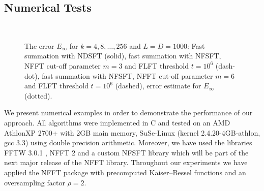 \subsection{Numerical Tests}

\begin{figure}[tb]
  \centering
  \hfill
  \\
  \caption{The error $E_{\infty}$ for $k = 4,8,\ldots,256$ and $L = D = 1000$: 
  Fast summation with NDSFT (solid), fast summation with NFSFT, 
  NFFT cut-off parameter $m = 3$ and FLFT threshold $t = 10^6$ (dash-dot), 
  fast summation with NFSFT, NFFT cut-off 
  parameter $m = 6$ and FLFT threshold $t = 10^6$ (dashed), error estimate for 
  $E_{\infty}$ (dotted).}
  \label{fig:error}
\end{figure}

We present numerical examples in order to demonstrate the performance of
our approach. All algorithms were implemented in C and tested on an 
AMD Athlon\texttrademark XP 2700+ with 2GB main memory, SuSe-Linux 
(kernel 2.4.20-4GB-athlon, gcc 3.3) using double precision arithmetic. 
Moreover, we have used the libraries FFTW 3.0.1 \cite{fftw}, NFFT 2
\cite{kupo02C} and a custom NFSFT library which will be part of the next 
major release of the NFFT library. Throughout our experiments we have 
applied the NFFT package \cite{kupo02C} with precomputed Kaiser--Bessel 
functions and an oversampling factor $\rho=2$.

